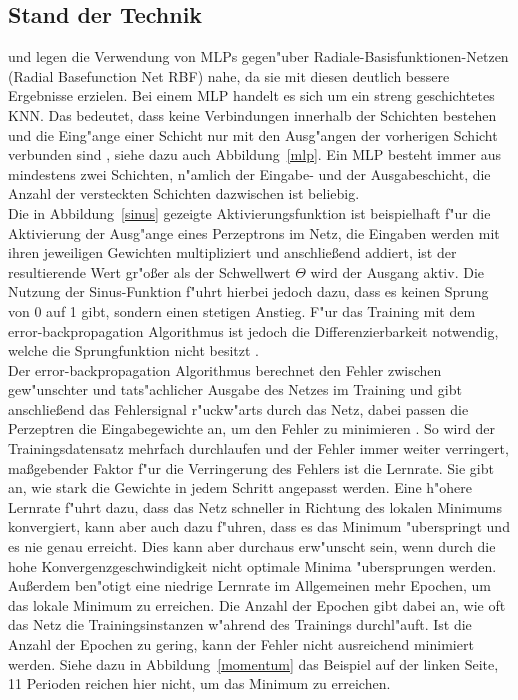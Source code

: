 \subsection{Stand der Technik}
\label{Stand der Technik}
\cite{liang2010load} und \cite{srinivasan2006neural} legen die Verwendung von MLPs gegen"uber Radiale-Basisfunktionen-Netzen (Radial Basefunction Net RBF) nahe, da sie mit diesen deutlich bessere Ergebnisse erzielen. 
Bei einem MLP handelt es sich um ein streng geschichtetes KNN. Das bedeutet, dass keine Verbindungen innerhalb der Schichten bestehen und die Eing"ange einer Schicht nur mit den Ausg"angen der vorherigen Schicht verbunden sind \cite{kruse2011computational}, siehe dazu auch Abbildung~\ref{mlp}. Ein MLP besteht immer aus mindestens zwei Schichten, n"amlich der Eingabe- und der Ausgabeschicht, die Anzahl der versteckten Schichten dazwischen ist beliebig.\\
Die in Abbildung~\ref{sinus} gezeigte Aktivierungsfunktion ist beispielhaft f"ur die Aktivierung der Ausg"ange eines Perzeptrons im Netz, die Eingaben werden mit ihren jeweiligen Gewichten multipliziert und anschlie{\ss}end addiert, ist der resultierende Wert gr"o{\ss}er als der Schwellwert $\Theta$ wird der Ausgang aktiv. Die Nutzung der Sinus-Funktion f"uhrt hierbei jedoch dazu, dass es keinen Sprung von 0 auf 1 gibt, sondern einen stetigen Anstieg. F"ur das Training mit dem error-backpropagation Algorithmus ist jedoch die Differenzierbarkeit notwendig, welche die Sprungfunktion nicht besitzt \cite{kruse2011computational}. \\
Der error-backpropagation Algorithmus berechnet den Fehler zwischen gew"unschter und tats"achlicher Ausgabe des Netzes im Training und gibt anschlie{\ss}end das Fehlersignal r"uckw"arts durch das Netz, dabei passen die Perzeptren die Eingabegewichte an, um den Fehler zu minimieren \cite{kruse2011computational}. So wird der Trainingsdatensatz mehrfach durchlaufen und der Fehler immer weiter verringert, ma{\ss}gebender Faktor f"ur die Verringerung des Fehlers ist die Lernrate. Sie gibt an, wie stark die Gewichte in jedem Schritt angepasst werden.  Eine h"ohere Lernrate f"uhrt dazu, dass das Netz schneller in Richtung des lokalen Minimums konvergiert, kann aber auch dazu f"uhren, dass es das Minimum "uberspringt und es nie genau erreicht. Dies kann aber durchaus erw"unscht sein, wenn durch die hohe Konvergenzgeschwindigkeit nicht optimale Minima "ubersprungen werden. Au{\ss}erdem ben"otigt eine niedrige Lernrate im Allgemeinen mehr Epochen, um das lokale Minimum zu erreichen. Die Anzahl der Epochen gibt dabei an, wie oft das Netz die Trainingsinstanzen w"ahrend des Trainings durchl"auft. Ist die Anzahl der Epochen zu gering, kann der Fehler nicht ausreichend minimiert werden. Siehe dazu in Abbildung~\ref{momentum} das Beispiel auf der linken Seite, 11 Perioden reichen hier nicht, um das Minimum zu erreichen. 
